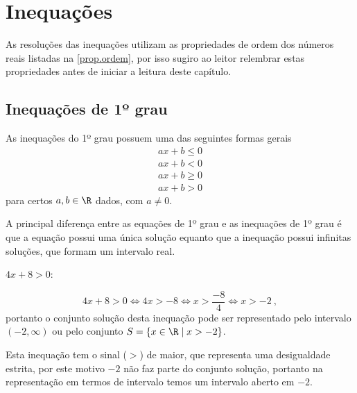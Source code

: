 \chapter{Inequações}

 As resoluções das inequações utilizam as propriedades de ordem dos números reais listadas na \autoref{prop.ordem}, por isso sugiro ao leitor relembrar estas propriedades antes de iniciar a leitura deste capítulo.

 \section{Inequações de 1º grau}
 
 \vskip0.3cm
 \colorbox{azul}{
 \begin{minipage}{0.9\linewidth}
 \begin{center}
  As inequações do 1º grau possuem uma das seguintes formas gerais
 \begin{eqnarray*}
 ax+b \leq 0 \\
 ax+b < 0 \\
 ax+b \geq 0 \\
 ax+b >0 
 \end{eqnarray*}  
 para certos $a, b \in \R$ dados, com $a \neq 0$.
 \end{center}
 \end{minipage}}
 \vskip0.3cm
  
 A principal diferença entre as equações de 1º grau e as inequações de 1º grau é que a equação possui uma única solução equanto que a inequação possui infinitas soluções, que formam um intervalo real.
 
 \begin{exem} 
 $4x + 8 > 0$:
 
\begin{equation}
4x + 8 > 0 \Leftrightarrow 4x > -8 \Leftrightarrow x > \frac{-8}{4} \Leftrightarrow x > -2 \ ,
\end{equation}
 portanto o conjunto solução desta inequação pode ser representado pelo intervalo $\left(-2, \infty \right)$ ou pelo conjunto $S=\{x \in \R \mid x > -2\}$. 
 
 Esta inequação tem o sinal ($>$) de maior, que representa uma desigualdade estrita, por este motivo $-2$ não faz parte do conjunto solução, portanto na representação em termos de intervalo temos um intervalo aberto em $-2$.
 \end{exem}
 
